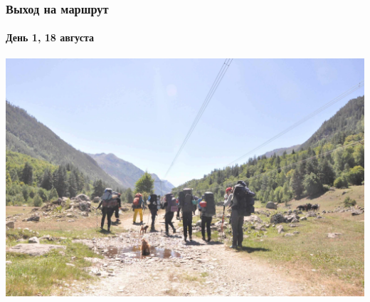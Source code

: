 \begin{frame}
	\frametitle{Выход на маршрут}
	\framesubtitle{День 1, 18 августа}
	\centering
	\includegraphics[width=\linewidth]{../pics/DSC_0412}
\end{frame}